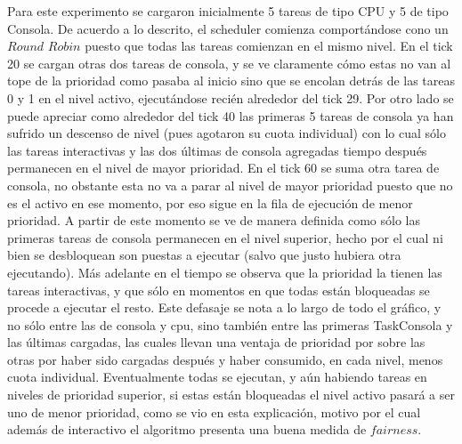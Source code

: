 Para este experimento se cargaron inicialmente 5 tareas de tipo CPU y 5 de tipo Consola. De acuerdo a lo descrito, el scheduler comienza comportándose cono un $Round$ $Robin$ puesto que todas las tareas comienzan en el mismo nivel. En el tick 20 se cargan otras dos tareas de consola, y se ve claramente cómo estas no van al tope de la prioridad como pasaba al inicio sino que se encolan detrás de las tareas 0 y 1 en el nivel activo, ejecutándose recién alrededor del tick 29. Por otro lado se puede apreciar como alrededor del tick 40 las primeras 5 tareas de consola ya han sufrido un descenso de nivel (pues agotaron su cuota individual) con lo cual sólo las tareas interactivas y las dos últimas de consola agregadas tiempo después permanecen en el nivel de mayor prioridad. En el tick 60 se suma otra tarea de consola, no obstante esta no va a parar al nivel de mayor prioridad puesto que no es el activo en ese momento, por eso sigue en la fila de ejecución de menor prioridad. A partir de este momento se ve de manera definida como sólo las primeras tareas de consola permanecen en el nivel superior, hecho por el cual ni bien se desbloquean son puestas a ejecutar (salvo que justo hubiera otra ejecutando). Más adelante en el tiempo se observa que la prioridad la tienen las tareas interactivas, y que sólo en momentos en que todas están bloqueadas se procede a ejecutar el resto. Este defasaje se nota a lo largo de todo el gráfico, y no sólo entre las de consola y cpu, sino también entre las primeras TaskConsola y las últimas cargadas, las cuales llevan una ventaja de prioridad por sobre las otras por haber sido cargadas después y haber consumido, en cada nivel, menos cuota individual. Eventualmente todas se ejecutan, y aún habiendo tareas en niveles de prioridad superior, si estas están bloqueadas el nivel activo pasará a ser uno de menor prioridad, como se vio en esta explicación, motivo por el cual además de interactivo el algoritmo presenta una buena medida de $fairness$.
